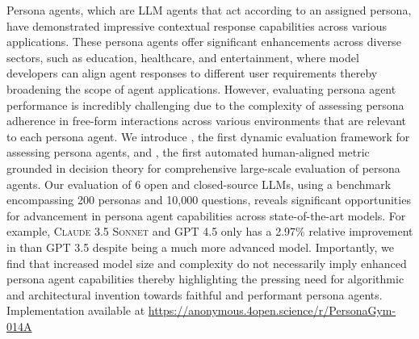 Persona agents, which are LLM agents that act according to an assigned persona, have demonstrated impressive contextual response capabilities across various applications. These persona agents offer significant enhancements across diverse sectors, such as education, healthcare, and entertainment, where model developers can align agent responses to different user requirements thereby broadening the scope of agent applications. However, evaluating persona agent performance is incredibly challenging due to the complexity of assessing persona adherence in free-form interactions across various environments that are relevant to each persona agent.
We introduce \benchmark, the first dynamic evaluation framework for assessing persona agents, and \score, the first automated human-aligned metric grounded in decision theory for comprehensive large-scale evaluation of persona agents. Our evaluation of 6 open and closed-source LLMs, using a benchmark encompassing 200 personas and 10,000 questions, reveals significant opportunities for advancement in persona agent capabilities across state-of-the-art models. 
For example, \textsc{Claude 3.5 Sonnet} and \textsc{GPT 4.5} only has a 2.97\% relative improvement in \score than \textsc{GPT 3.5} despite being a much more advanced model.
Importantly, we find that increased model size and complexity do not necessarily imply enhanced persona agent capabilities thereby highlighting the pressing need for algorithmic and architectural invention towards faithful and performant persona agents. Implementation available at \href{https://anonymous.4open.science/r/PersonaGym-014A/README.md}{https://anonymous.4open.science/r/PersonaGym-014A}
